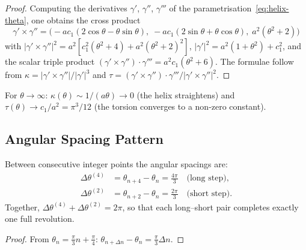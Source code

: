\begin{proof}
Computing the derivatives $\gamma'$, $\gamma''$, $\gamma'''$ of the
parametrisation~\eqref{eq:helix-theta}, one obtains the cross product
\[
  \gamma' \times \gamma''
  = \bigl(-ac_1(2\cos\theta - \theta\sin\theta),\;
          -ac_1(2\sin\theta + \theta\cos\theta),\;
          a^2(\theta^2+2)\bigr)
\]
with $|\gamma' \times \gamma''|^2 = a^2[c_1^2(\theta^2+4) +
a^2(\theta^2+2)^2]$, $|\gamma'|^2 = a^2(1+\theta^2) + c_1^2$, and
the scalar triple product
$(\gamma' \times \gamma'') \cdot \gamma''' = a^2 c_1(\theta^2+6)$.
The formulae follow from $\kappa = |\gamma' \times \gamma''|/|\gamma'|^3$
and $\tau = (\gamma' \times \gamma'') \cdot \gamma''' / |\gamma' \times
\gamma''|^2$.
\end{proof}

\begin{remark}[Asymptotics]
For $\theta \to \infty$:
$\kappa(\theta) \sim 1/(a\theta) \to 0$ (the helix straightens) and
$\tau(\theta) \to c_1/a^2 = \pi^3/12$ (the torsion converges to a
non-zero constant).
\end{remark}

\subsection{Angular Spacing Pattern}\label{subsec:angles}

\begin{proposition}\label{prop:angles}
Between consecutive integer points the angular spacings are:
\begin{align}
  \Delta\theta^{(4)} &= \theta_{n+4} - \theta_n = \tfrac{4\pi}{3}
  \quad\text{(long step)},
  \label{eq:angle-long}\\
  \Delta\theta^{(2)} &= \theta_{n+2} - \theta_n = \tfrac{2\pi}{3}
  \quad\text{(short step)}.
  \label{eq:angle-short}
\end{align}
Together, $\Delta\theta^{(4)} + \Delta\theta^{(2)} = 2\pi$,
so that each long--short pair completes exactly one full revolution.
\end{proposition}

\begin{proof}
From $\theta_n = \frac{\pi}{3}n + \frac{\pi}{4}$:
$\theta_{n+\Delta n} - \theta_n = \frac{\pi}{3}\Delta n$.
\end{proof}
